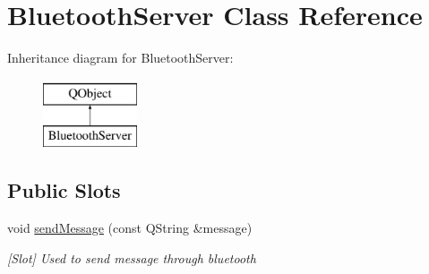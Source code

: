 \hypertarget{classBluetoothServer}{}\section{Bluetooth\+Server Class Reference}
\label{classBluetoothServer}
Inheritance diagram for Bluetooth\+Server\+:\begin{figure}[H]
\begin{center}
\leavevmode
\includegraphics[height=2.000000cm]{classBluetoothServer}
\end{center}
\end{figure}
\subsection*{Public Slots}
\begin{DoxyCompactItemize}
\item 
void \hyperlink{classBluetoothServer_ab4b42cafe04f9b2d50abfd4f0b2986e9}{send\+Message} (const Q\+String \&message)
\begin{DoxyCompactList}\small\item\em \mbox{[}Slot\mbox{]} Used to send message through bluetooth \end{DoxyCompactList}\end{DoxyCompactItemize}
